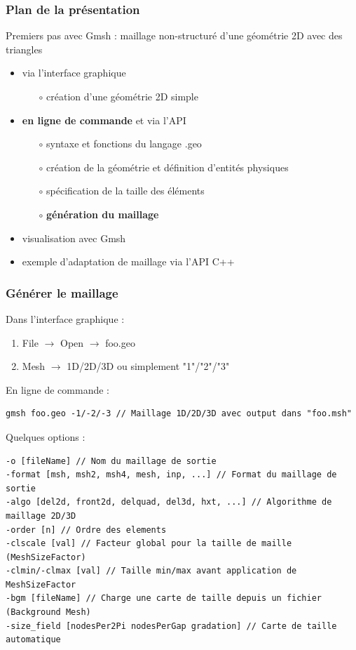 \documentclass[aspectratio=169]{beamer}
\begin{document}
\begin{frame}[fragile]
\frametitle{Plan de la présentation}
Premiers pas avec Gmsh : maillage non-structuré d'une géométrie 2D avec des triangles
\begin{itemize}
  \item via l'interface graphique
  \begin{itemize}
    \item[$\circ$] création d'une géométrie 2D simple
  \end{itemize}
  \item \textbf{en ligne de commande} et via l'API
  \begin{itemize}
    \item[$\circ$] syntaxe et fonctions du langage .geo
    \item[$\circ$] création de la géométrie et définition d'entités physiques
    \item[$\circ$] spécification de la taille des éléments
    \item[$\circ$] \textbf{génération du maillage}
  \end{itemize}
  \item visualisation avec Gmsh
  \item exemple d'adaptation de maillage via l'API C++
\end{itemize}
\end{frame}

\begin{frame}[fragile]
\frametitle{Générer le maillage}
Dans l'interface graphique :
\begin{enumerate}
  \item File $\rightarrow$ Open $\rightarrow$ foo.geo
  \item Mesh $\rightarrow$ 1D/2D/3D ou simplement "1"/"2"/"3"
\end{enumerate}
En ligne de commande :
\begin{lstlisting}[frame=none, aboveskip=1mm, belowskip=0mm]
gmsh foo.geo -1/-2/-3 // Maillage 1D/2D/3D avec output dans "foo.msh"
\end{lstlisting}
Quelques options :
\begin{lstlisting}[frame=non,aboveskip=1mm,belowskip=0.5mm]
-o [fileName] // Nom du maillage de sortie
-format [msh, msh2, msh4, mesh, inp, ...] // Format du maillage de sortie
-algo [del2d, front2d, delquad, del3d, hxt, ...] // Algorithme de maillage 2D/3D
-order [n] // Ordre des elements
-clscale [val] // Facteur global pour la taille de maille (MeshSizeFactor)
-clmin/-clmax [val] // Taille min/max avant application de MeshSizeFactor
-bgm [fileName] // Charge une carte de taille depuis un fichier (Background Mesh)
-size_field [nodesPer2Pi nodesPerGap gradation] // Carte de taille automatique
\end{lstlisting}
\end{frame}
\end{document}
